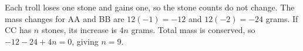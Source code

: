 Each troll loses one stone and gains one, so the stone counts do not change. The mass changes for AA and BB are $12(-1)=-12$ and $12(-2)=-24$ grams. If CC has $n$ stones, its increase is $4n$ grams. Total mass is conserved, so $-12-24+4n=0$, giving $\boxed{n=9}$.

